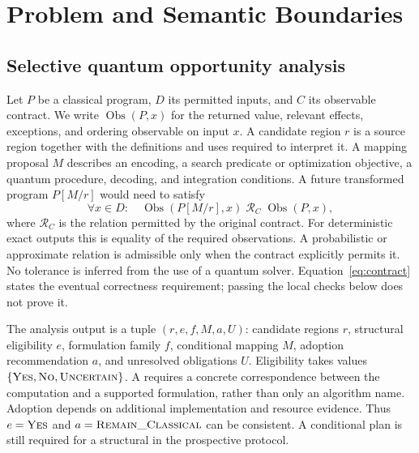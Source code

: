 \section{Problem and Semantic Boundaries}
\label{sec:problem}
\subsection{Selective quantum opportunity analysis}
Let $P$ be a classical program, $D$ its permitted inputs, and $C$ its observable
contract. We write $\operatorname{Obs}(P,x)$ for the returned value, relevant
effects, exceptions, and ordering observable on input $x$. A candidate region
$r$ is a source region together with the definitions and uses required to
interpret it. A mapping proposal $M$ describes an encoding, a search predicate
or optimization objective, a quantum procedure, decoding, and integration
conditions. A future transformed program $P[M/r]$ would need to satisfy
\begin{equation}
  \forall x\in D:\quad
  \operatorname{Obs}(P[M/r],x)\;\mathcal{R}_{C}\;\operatorname{Obs}(P,x),
  \label{eq:contract}
\end{equation}
where $\mathcal{R}_{C}$ is the relation permitted by the original contract.
For deterministic exact outputs this is equality of the required observations.
A probabilistic or approximate relation is admissible only when the contract
explicitly permits it. No tolerance is inferred from the use of a quantum solver.
Equation~\ref{eq:contract} states the eventual correctness requirement; passing
the local checks below does not prove it.

The analysis output is a tuple $(r,e,f,M,a,U)$: candidate regions $r$, structural
eligibility $e$, formulation family $f$, conditional mapping $M$, adoption
recommendation $a$, and unresolved obligations $U$. Eligibility takes values
$\{\textsc{Yes},\textsc{No},\textsc{Uncertain}\}$. A \yes{} requires a concrete correspondence between
the computation and a supported formulation, rather than only an algorithm name.
Adoption depends on additional implementation and resource evidence. Thus
$e=\textsc{Yes}$ and $a=\textsc{Remain\_Classical}$ can be consistent. A conditional plan is still
required for a structural \yes{} in the prospective protocol.

